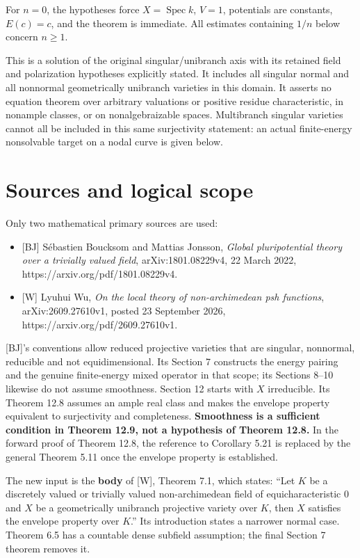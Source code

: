 \documentclass[11pt]{article}
\providecommand{\tightlist}{\setlength{\itemsep}{0pt}\setlength{\parskip}{0pt}}
\begin{document}
For \(n=0\), the hypotheses force \(X=\operatorname{Spec}k\), \(V=1\),
potentials are constants, \(E(c)=c\), and the theorem is immediate. All
estimates containing \(1/n\) below concern \(n\geq1\).

This is a solution of the original singular/unibranch axis with its
retained field and polarization hypotheses explicitly stated. It
includes all singular normal and all nonnormal geometrically unibranch
varieties in this domain. It asserts no equation theorem over arbitrary
valuations or positive residue characteristic, in nonample classes, or
on nonalgebraizable spaces. Multibranch singular varieties cannot all be
included in this same surjectivity statement: an actual finite-energy
nonsolvable target on a nodal curve is given below.

\section{Sources and logical scope}\label{sources-and-logical-scope}

Only two mathematical primary sources are used:

\begin{itemize}
\tightlist
\item
  {[}BJ{]} Sébastien Boucksom and Mattias Jonsson, \emph{Global
  pluripotential theory over a trivially valued field},
  arXiv:1801.08229v4, 22 March 2022, https://arxiv.org/pdf/1801.08229v4.
\item
  {[}W{]} Lyuhui Wu, \emph{On the local theory of non-archimedean psh
  functions}, arXiv:2609.27610v1, posted 23 September 2026,
  https://arxiv.org/pdf/2609.27610v1.
\end{itemize}

{[}BJ{]}'s conventions allow reduced projective varieties that are
singular, nonnormal, reducible and not equidimensional. Its Section 7
constructs the energy pairing and the genuine finite-energy mixed
operator in that scope; its Sections 8--10 likewise do not assume
smoothness. Section 12 starts with \(X\) irreducible. Its Theorem 12.8
assumes an ample real class and makes the envelope property equivalent
to surjectivity and completeness. \textbf{Smoothness is a sufficient
condition in Theorem 12.9, not a hypothesis of Theorem 12.8.} In the
forward proof of Theorem 12.8, the reference to Corollary 5.21 is
replaced by the general Theorem 5.11 once the envelope property is
established.

The new input is the \textbf{body} of {[}W{]}, Theorem 7.1, which
states: ``Let \(K\) be a discretely valued or trivially valued
non-archimedean field of equicharacteristic 0 and \(X\) be a
geometrically unibranch projective variety over \(K\), then \(X\)
satisfies the envelope property over \(K\).'' Its introduction states a
narrower normal case. Theorem 6.5 has a countable dense subfield
assumption; the final Section 7 theorem removes it.
\end{document}
